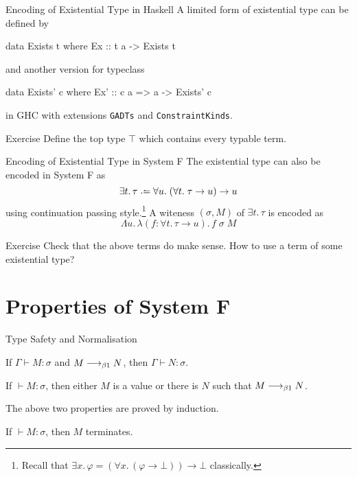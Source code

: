 \begin{frame}[fragile]{Encoding of Existential Type in Haskell}
  A limited form of existential type can be defined by 
  \begin{semiverbatim}
    data Exists t where
      Ex :: t a -> Exists t
  \end{semiverbatim}
  and another version for typeclass
  \begin{semiverbatim}
    data Exists' c where
      Ex' :: c a => a -> Exists' c
  \end{semiverbatim}
  in GHC with extensions \texttt{GADTs} and \texttt{ConstraintKinds}. 

  \begin{block}{Exercise}
    Define the top type $\top$ which contains every typable term.
  \end{block}
\end{frame}

\begin{frame}{Encoding of Existential Type in System F}
  The existential type can also be encoded in System F as 
  \[
    \exists t.\, \tau \defeq \forall u.\; (\forall t.\; \tau \to u) \to u
  \]
  using continuation passing style.\footnote{Recall that $\exists x.\,\varphi
  = (\forall x.\, (\varphi \to \bot)) \to \bot$ classically.  }
  A witeness $(\sigma, M)$ of $\exists t.\, \tau$ is encoded as
  \[
    \Lambda u.\,\lambda (f : \forall t.\, \tau \to u).\, f\;\sigma\;M
  \]

  \begin{block}{Exercise}
    Check that the above terms do make sense. How to use a term of some existential
    type? 
  \end{block}
  
\end{frame}
\section{Properties of System F}
\begin{frame}{Type Safety and Normalisation}
  \begin{theorem}[Preservation]
    If $\Gamma \vdash M : \sigma$ 
    and $M \longrightarrow_{\beta1} N$, then
    $\Gamma \vdash N : \sigma$. 
  \end{theorem}

  \begin{theorem}[Progress]
    If ${}\vdash M : \sigma$, then either $M$ is a value or
    there is $N$ such that $M \longrightarrow_{\beta1} N$. 
  \end{theorem}
  The above two properties are proved by induction.

  \begin{theorem}[Normalisation]
    If $\vdash M : \sigma$, then $M$ terminates. 
  \end{theorem}
\end{frame}

